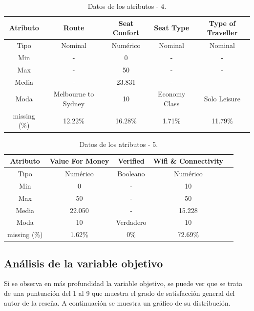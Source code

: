 \documentclass[es]{uc3mreport}
\begin{document}
\begin{report}
\begin{table}[H]
\begin{tabular}{@{}ccccc@{}}
        \toprule
        Atributo     & Route               & Seat Confort & Seat Type     & Type of Traveller \\
        \midrule
        Tipo         & Nominal             & Numérico     & Nominal       & Nominal           \\
        Min          & -                   & 0            & -             & -                 \\
        Max          & -                   & 50           & -             & -                 \\
        Media        & -                   & 23.831       & -             &                   \\
        Moda         & Melbourne to Sydney & 10           & Economy Class & Solo Leisure      \\
        missing (\%) & 12.22\%             & 16.28\%      & 1.71\%        & 11.79\%           \\
        \bottomrule
    \end{tabular}
    \caption{Datos de los atributos - 4.}
\end{table}
\begin{table}[H]
    \center
    \begin{tabular}{@{}ccccc@{}}
        \toprule
        Atributo     & Value For Money & Verified  & Wifi \& Connectivity \\
        \midrule
        Tipo         & Numérico        & Booleano  & Numérico             \\
        Min          & 0               & -         & 10                   \\
        Max          & 50              & -         & 50                   \\
        Media        & 22.050          & -         & 15.228               \\
        Moda         & 10              & Verdadero & 10                   \\
        missing (\%) & 1.62\%          & 0\%       & 72.69\%              \\
        \bottomrule
    \end{tabular}
    \caption{Datos de los atributos - 5.}
\end{table}

\subsection{Análisis de la variable objetivo}
\label{subsec:variable-objetivo}
Si se observa en más profundidad la variable objetivo, se puede ver que se trata de una
puntuación del 1 al 9 que muestra el grado de satisfacción general del autor de
la reseña. A continuación se muestra un gráfico de su distribución.


\end{report}
\end{document}
